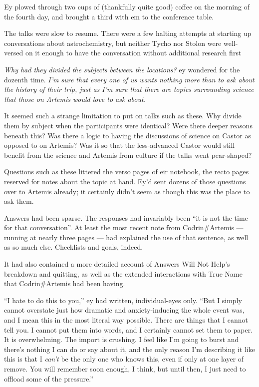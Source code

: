 Ey plowed through two cups of (thankfully quite good) coffee on the morning of the fourth day, and brought a third with em to the conference table.

The talks were slow to resume. There were a few halting attempts at starting up conversations about astrochemistry, but neither Tycho nor Stolon were well-versed on it enough to have the conversation without additional research first

\emph{Why had they divided the subjects between the locations?} ey wondered for the dozenth time. \emph{I'm sure that every one of us wants nothing more than to ask about the history of their trip, just as I'm sure that there are topics surrounding science that those on Artemis would love to ask about.}

It seemed such a strange limitation to put on talks such as these. Why divide them by subject when the participants were identical? Were there deeper reasons beneath this? Was there a logic to having the discussions of science on Castor as opposed to on Artemis? Was it so that the less-advanced Castor would still benefit from the science and Artemis from culture if the talks went pear-shaped?

Questions such as these littered the verso pages of eir notebook, the recto pages reserved for notes about the topic at hand. Ey'd sent dozens of those questions over to Artemis already; it certainly didn't seem as though this was the place to ask them.

Answers had been sparse. The responses had invariably been ``it is not the time for that conversation''. At least the most recent note from Codrin\#Artemis — running at nearly three pages — had explained the use of that sentence, as well as so much else. Checklists and goals, indeed.

It had also contained a more detailed account of Answers Will Not Help's breakdown and quitting, as well as the extended interactions with True Name that Codrin\#Artemis had been having.

``I hate to do this to you,'' ey had written, individual-eyes only. ``But I simply cannot overstate just how dramatic and anxiety-inducing the whole event was, and I mean this in the most literal way possible. There are things that I cannot tell you. I cannot put them into words, and I certainly cannot set them to paper. It is overwhelming. The import is crushing. I feel like I'm going to burst and there's nothing I can do or say about it, and the only reason I'm describing it like this is that I \emph{can't} be the only one who knows this, even if only at one layer of remove. You will remember soon enough, I think, but until then, I just need to offload some of the pressure.''

